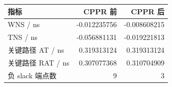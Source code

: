 \begin{center}\small
\begin{tabular}{lrr}
\toprule
指标 & CPPR 前 & CPPR 后 \\
\midrule
WNS / ns & -0.012235756 & -0.008608215 \\
TNS / ns & -0.056881131 & -0.019221813 \\
关键路径 AT / ns & 0.319313124 & 0.319313124 \\
关键路径 RAT / ns & 0.307077368 & 0.310704909 \\
负 slack 端点数 & 9 & 3 \\
\bottomrule
\end{tabular}
\end{center}
